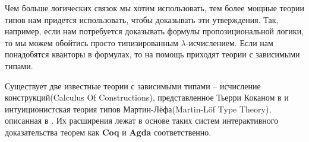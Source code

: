 Чем больше логических связок мы хотим использовать, тем более мощные теории типов  нам придется использовать, чтобы доказывать эти утверждения. Так, например, если нам потребуется доказывать формулы пропозициональной логики, то мы можем обойтись просто типизированным $\lambda$-исчислением. Если нам понадобятся кванторы в формулах, то на помощь приходят теории с зависимыми типами.

Существует две известные теории с зависимыми типами -- исчисление конструкций(Calculus Of Constructions), представленное Тьерри Коканом в \cite{coquand1988calculus} и интуиционистская теория типов Мартин-Лёфа(Martin-L{\"o}f Type Theory), описанная в \cite{martin1975intuitionistic}. Их расширения лежат в основе таких систем интерактивного доказательства теорем как \textbf{Coq} и \textbf{Agda} соответственно.
